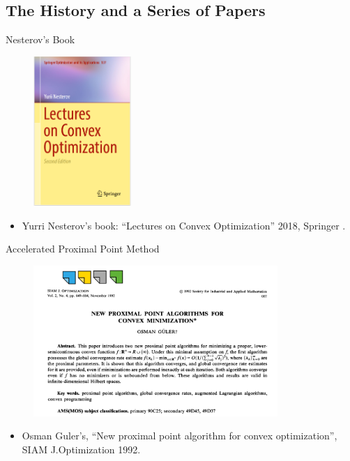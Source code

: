 \documentclass[11pt]{beamer}
\begin{document}
    \subsection{The History and a Series of Papers}
        \begin{frame}{Nesterov's Book}
            \begin{figure}
                \centering
                \includegraphics[width=10em]{assets/Nesterov Book.png}    
            \end{figure}
            \begin{itemize}
                \item Yurri Nesterov's book: ``Lectures on Convex Optimization'' 2018, Springer \cite{nesterov_lectures_2018}. 
            \end{itemize}
        \end{frame}
        \begin{frame}{Accelerated Proximal Point Method}
            \begin{figure}
                \centering
                \includegraphics[width=25em]{assets/Acc ppm}
            \end{figure}
            \begin{itemize}
                \item Osman Guler's, ``New proximal point algorithm for convex optimization'', SIAM J.Optimization 1992. \cite{guler_new_1992}
            \end{itemize}
        \end{frame}
\end{document}
